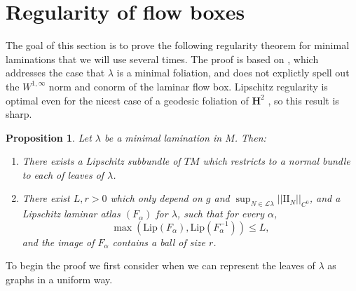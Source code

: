 \documentclass[reqno,11pt]{amsart}
\newcommand{\Hyp}{\mathbf H}
\newcommand{\Leaves}{\mathscr L}
\newcommand{\Two}{\mathrm{I\!I}}
\newcommand{\Lip}{\mathrm{Lip}}
\newtheorem{proposition}[theorem]{Proposition}
\theoremstyle{definition}
\numberwithin{equation}{section}
\begin{document}
\section{Regularity of flow boxes}\label{Regularity}
The goal of this section is to prove the following regularity theorem for minimal laminations that we will use several times.
The proof is based on \cite[Theorem 1.1]{Solomon86}, which addresses the case that $\lambda$ is a minimal foliation, and does not explictly spell out the $W^{1, \infty}$ norm and conorm of the laminar flow box.
Lipschitz regularity is optimal even for the nicest case of a geodesic foliation of $\Hyp^2$ \cite[\S1]{Solomon86}, so this result is sharp.

\begin{proposition}\label{regularity theorem}
Let $\lambda$ be a minimal lamination in $M$. Then:
\begin{enumerate}
\item There exists a Lipschitz subbundle of $TM$ which restricts to a normal bundle to each of leaves of $\lambda$.
\item There exist $L, r > 0$ which only depend on $g$ and $\sup_{N \in \Leaves \lambda} ||\Two_N||_{C^0}$, and a Lipschitz laminar atlas $(F_\alpha)$ for $\lambda$, such that for every $\alpha$,
\begin{equation}\label{conorm of flow box}
	\max(\Lip(F_\alpha), \Lip(F_\alpha^{-1})) \leq L,
\end{equation}
and the image of $F_\alpha$ contains a ball of size $r$.
\end{enumerate}
\end{proposition}

To begin the proof we first consider when we can represent the leaves of $\lambda$ as graphs in a uniform way.
\end{document}
